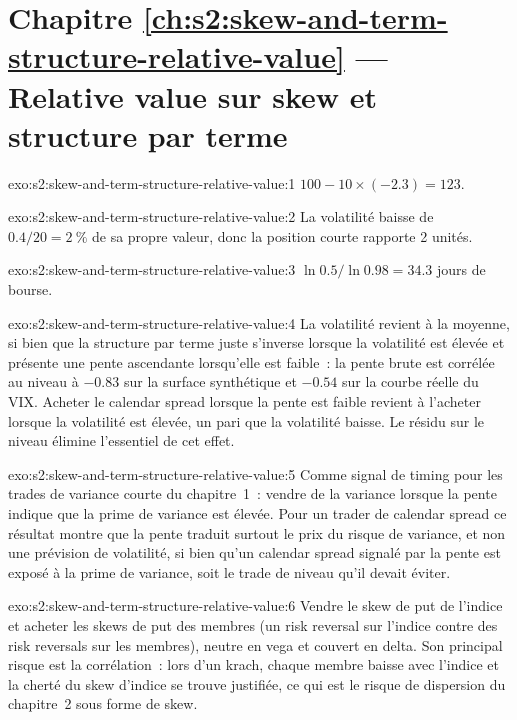 \section*{Chapitre \ref{ch:s2:skew-and-term-structure-relative-value} --- Relative value sur skew et structure par terme}

\begin{solution}{exo:s2:skew-and-term-structure-relative-value:1}
$100 - 10 \times (-2.3) = 123$.
\end{solution}

\begin{solution}{exo:s2:skew-and-term-structure-relative-value:2}
La volatilité baisse de $0.4/20 = 2~\%$ de sa propre valeur, donc la position courte rapporte 2 unités.
\end{solution}

\begin{solution}{exo:s2:skew-and-term-structure-relative-value:3}
$\ln 0.5/\ln 0.98 = 34.3$ jours de bourse.
\end{solution}

\begin{solution}{exo:s2:skew-and-term-structure-relative-value:4}
La volatilité revient à la moyenne, si bien que la structure par terme juste s'inverse lorsque la volatilité est élevée et présente une pente ascendante lorsqu'elle est faible~: la pente brute est corrélée au niveau à
$-0.83$ sur la surface synthétique et $-0.54$ sur la courbe réelle du VIX. Acheter le calendar spread lorsque la pente est faible revient à l'acheter lorsque la volatilité est élevée, un pari
que la volatilité baisse. Le résidu sur le niveau élimine l'essentiel de cet effet.
\end{solution}

\begin{solution}{exo:s2:skew-and-term-structure-relative-value:5}
Comme signal de timing pour les trades de variance courte du chapitre~1~: vendre de la variance lorsque la pente indique que la prime de variance est élevée. Pour un trader de calendar spread
ce résultat montre que la pente traduit surtout le prix du risque de variance, et non une prévision de volatilité, si bien qu'un calendar spread signalé par la pente est exposé à la prime
de variance, soit le trade de niveau qu'il devait éviter.
\end{solution}

\begin{solution}{exo:s2:skew-and-term-structure-relative-value:6}
Vendre le skew de put de l'indice et acheter les skews de put des membres (un risk reversal sur l'indice contre des risk reversals sur les membres), neutre en vega et
couvert en delta. Son principal risque est la corrélation~: lors d'un krach, chaque membre baisse avec l'indice et la cherté du skew d'indice se trouve justifiée, ce qui est
le risque de dispersion du chapitre~2 sous forme de skew.
\end{solution}

